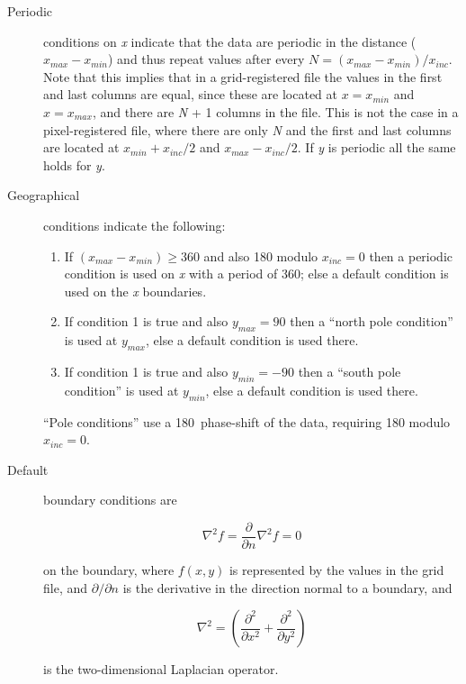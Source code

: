 \begin{description}

\item[Periodic] conditions on {\it x} indicate that the data are
periodic in the distance ($x_{max} - x_{min}$) and thus repeat
values after every $N = (x_{max} - x_{min})/x_{inc}$.  Note that
this implies that in a grid-registered file the values in the first
and last columns are equal, since these are located at $x = x_{min}$
and $x = x_{max}$, and there are {\it N} + 1 columns in the file.
This is not the case in a pixel-registered file, where there are only
{\it N} and the first and last columns are located at
$x_{min} + x_{inc}/2$ and $x_{max} - x_{inc}/2$.  If {\it y} is
periodic all the same holds for {\it y}.

\item[Geographical] conditions indicate the following:

\begin{enumerate}

\item If $(x_{max} - x_{min}) \geq 360$ and also 180 modulo $x_{inc} = 0$
then a periodic condition is used on {\it x} with a period of 360;
else a default condition is used on the {\it x} boundaries.

\item If condition 1 is true and also $y_{max} = 90$ then a
``north pole condition'' is used at $y_{max}$, else a default
condition is used there.

\item If condition 1 is true and also $y_{min} = -90$ then a
``south pole condition'' is used at $y_{min}$, else a default
condition is used there.

\end{enumerate} 

``Pole conditions'' use a 180\DS\ phase-shift of the data,
requiring 180 modulo $x_{inc} = 0$.

\item[Default] boundary conditions are

\[ \nabla^2 f = \frac{\partial}{\partial n} \nabla^2 f = 0 \] 

on the boundary, where $f(x, y)$ is represented by the values in
the grid file, and $\partial/\partial n$ is the derivative in the direction normal to a
boundary, and

\[ \nabla^2 = \left(\frac{\partial^2}{\partial x^2} + \frac{\partial^2}{\partial y^2}\right) \]

is the two-dimensional Laplacian operator.

\end{description}

